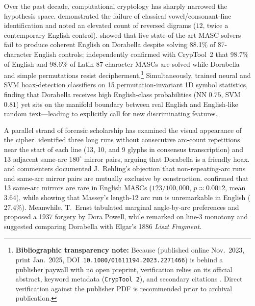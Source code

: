 \documentclass[10pt,a4paper,twocolumn]{article}
\newcommand{\code}[1]{\texttt{\small #1}}
\begin{document}
Over the past decade, computational cryptology has sharply narrowed the hypothesis space. \citet{schmeh2018dorabella} demonstrated the failure of classical vowel/consonant-line identification and noted an elevated count of reversed digrams ($12$, twice a contemporary English control). \citet{hauer2021dorabella} showed that five state-of-the-art MASC solvers fail to produce coherent English on Dorabella despite solving 88.1\% of 87-character English controls; \citet{wase2025dorabella} independently confirmed with CrypTool~2 that 98.7\% of English and 98.6\% of Latin 87-character MASCs are solved while Dorabella and simple permutations resist decipherment.\footnote{\textbf{Bibliographic transparency note:} Because \citet{wase2025dorabella} (published online Nov.\ 2023, print Jan.\ 2025, DOI~\code{10.1080/01611194.2023.2271466}) is behind a publisher paywall with no open preprint, verification relies on its official abstract, keyword metadata (\code{CrypTool 2}), and secondary citations \citep{foxon2024ann}. Direct verification against the publisher PDF is recommended prior to archival publication.} Simultaneously, \citet{foxon2024ann,foxon2025ml} trained neural and SVM hoax-detection classifiers on 15 permutation-invariant 1D symbol statistics, finding that Dorabella receives high English-class probabilities (NN $0.75$, SVM $0.81$) yet sits on the manifold boundary between real English and English-like random text---leading \citet{foxon2025ml} to explicitly call for new discriminating features.

A parallel strand of forensic scholarship has examined the visual appearance of the cipher. \citet{massey2017dorabella} identified three long runs without consecutive arc-count repetitions near the start of each line (13, 10, and 9 glyphs in consensus transcription) and 13 adjacent same-arc $180^\circ$ mirror pairs, arguing that Dorabella is a friendly hoax. \citet{pelling2019dorabella} and commenters documented J.~Rehling's objection that non-repeating-arc runs and same-arc mirror pairs are mutually exclusive by construction. \citet{hauer2021dorabella} confirmed that 13 same-arc mirrors are rare in English MASCs ($123/100{,}000$, $p \approx 0.0012$, mean $3.64$), while showing that Massey's length-12 arc run is unremarkable in English ($27.4\%$). Meanwhile, T.~Ernst \citep[summarized in][]{schmeh2021faelschung} tabulated marginal angle-by-arc preferences and proposed a 1937 forgery by Dora Powell, while \citet{pelling2019dorabella} remarked on line-3 monotony and suggested comparing Dorabella with Elgar's 1886 \emph{Liszt Fragment}.
\end{document}
